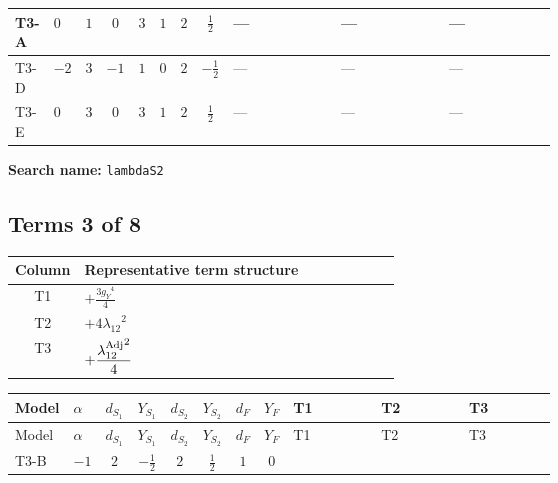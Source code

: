 \documentclass[8pt]{article}
\begin{document}
\begin{landscape}
\begin{longtable}{@{}llcccccc >{\raggedright\arraybackslash}p{0.21\linewidth} >{\raggedright\arraybackslash}p{0.21\linewidth} >{\raggedright\arraybackslash}p{0.21\linewidth}@{}}
\midrule
T3-A & $0$ & $1$ & $0$ & $3$ & $1$ & $2$ & $\frac{1}{2}$ & --- & --- & --- \\
\midrule
T3-D & $-2$ & $3$ & $-1$ & $1$ & $0$ & $2$ & $-\frac{1}{2}$ & --- & --- & --- \\
\midrule
T3-E & $0$ & $3$ & $0$ & $3$ & $1$ & $2$ & $\frac{1}{2}$ & --- & --- & --- \\
\midrule
\bottomrule
\end{longtable}
\clearpage
\noindent\textbf{Search name: }\texttt{lambdaS2}\par\smallskip
\subsection*{Terms 3 of 8}
\begin{center}
\begin{tabular}{@{}c >{\raggedright\arraybackslash}p{0.82\linewidth}@{}}
\toprule
Column & Representative term structure \\
\midrule
T1 & \(\displaystyle +\frac{3 {g_Y}^4}{4}\) \\
\midrule
T2 & \(\displaystyle +4 {\lambda_{12}}^2\) \\
\midrule
T3 & \(\displaystyle +\frac{{\lambda_{12}^{\rm Adj}}^2}{4}\) \\
\midrule
\bottomrule
\end{tabular}
\end{center}
\smallskip
\tiny
\begin{longtable}{@{}llcccccc >{\raggedright\arraybackslash}p{0.21\linewidth} >{\raggedright\arraybackslash}p{0.21\linewidth} >{\raggedright\arraybackslash}p{0.21\linewidth}@{}}
\toprule
Model & $\alpha$ & $d_{S_1}$ & $Y_{S_1}$ & $d_{S_2}$ & $Y_{S_2}$ & $d_F$ & $Y_F$ & T1 & T2 & T3 \\
\midrule
\endfirsthead
\toprule
Model & $\alpha$ & $d_{S_1}$ & $Y_{S_1}$ & $d_{S_2}$ & $Y_{S_2}$ & $d_F$ & $Y_F$ & T1 & T2 & T3 \\
\midrule
\endhead
T3-B & $-1$ & $2$ & $-\frac{1}{2}$ & $2$ & $\frac{1}{2}$ & $1$ & $0$ & \scriptsize\adjustbox{max width=\linewidth}{$\begin{gathered} +\frac{3 {g_Y}^4}{4}\end{gathered}$} & \scriptsize\adjustbox{max width=\linewidth}{$\begin{gathered} +4 {\lambda_{12}}^2\end{gathered}$} & \scriptsize\adjustbox{max width=\linewidth}{$\begin{gathered} +\frac{{\lambda_{12}^{\rm Adj}}^2}{4}\end{gathered}$} \\

\end{longtable}
\end{landscape}
\end{document}
